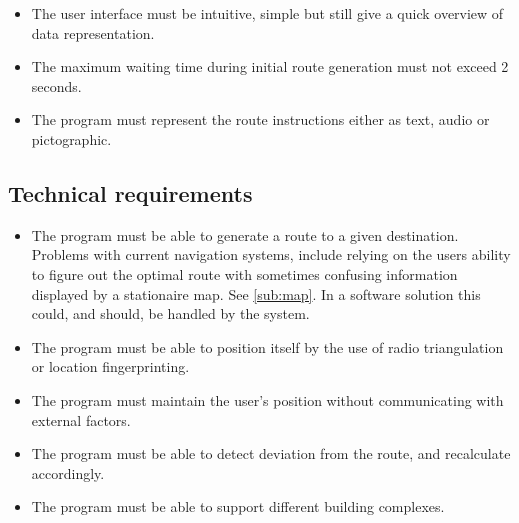 \begin{itemize}
	\item The user interface must be intuitive, simple but still give a quick overview of data representation.
	\item The maximum waiting time during initial route generation must not exceed 2 seconds.
	\item The program must represent the route instructions either as text, audio or pictographic.
\end{itemize}


\subsection{Technical requirements}

\begin{itemize}
	\item The program must be able to generate a route to a given destination. 
		{Problems with current navigation systems, include relying on the users ability to figure out the optimal route with sometimes confusing information displayed by a stationaire map. See \cref{sub:map}. In a software solution this could, and should, be handled by the system.}
	\item The program must be able to position itself by the use of radio triangulation or location fingerprinting.
	\item The program must maintain the user's position without communicating with external factors.
	\item The program must be able to detect deviation from the route, and recalculate accordingly.
	\item The program must be able to support different building complexes.
\end{itemize}

